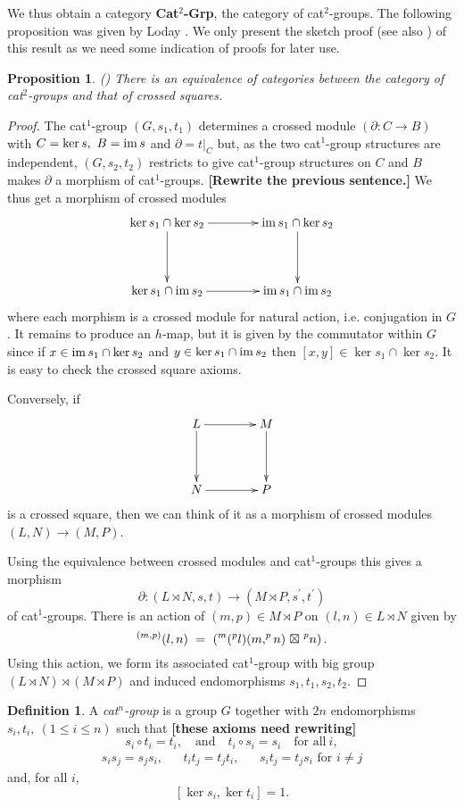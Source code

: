 \documentclass[a4paper,11pt]{article}
\theoremstyle{plain}
\newtheorem{proposition}[theorem]{Proposition}
\theoremstyle{definition}
\newtheorem{definition}[theorem]{Definition}
\begin{document}
We thus obtain a category \textbf{Cat}$^{2}$\textbf{-Grp}, 
the category of cat$^{2}$-groups. 
The following proposition was given by Loday \cite{Loday}. 
We only present the sketch proof (see also \cite{mutpor}) of this result 
as we need some indication of proofs for later use.

\begin{proposition}
	\label{loday} \emph{(\cite{Loday})} 
	There is an equivalence of categories between the category of cat$^{2}$-groups 
	and that of crossed squares.
\end{proposition}
\begin{proof}
	The cat$^{1}$-group $(G,s_1,t_1)$ determines a crossed module 
	$(\partial : C \rightarrow B)$ with $C = \ker s,~ B = \mathrm{im}\, s$ and $\partial =t|_{C}$ 
	but, as the two cat$^{1}$-group structures are independent, 
	$(G,s_2,t_2)$ restricts to give cat$^{1}$-group structures on $C$ 
	and $B$ makes $\partial $ a morphism of cat$^{1}$-groups. 
	{\bf[Rewrite the previous sentence.]} 
	We thus get a morphism of crossed modules
	\[
	\xymatrix@R=40pt@C=40pt
	{ \ker s_1 \cap \ker s_2 \ar[d] \ar[r] 
		& \im s_1 \cap \ker s_2 \ar[d] \\ 
		\ker s_1 \cap \im s_2 \ar[r] 
		& \im s_1 \cap \im s_2 } 
	\]
	\noindent where each morphism is a crossed module for natural action, 
	i.e. conjugation in $G$. 
	It remains to produce an $h$-map, but it is given by the commutator within $G$ 
	since if $x \in \mathrm{im}\, s_1 \cap \ker s_2$ 
	and $y\in \ker s_1 \cap \mathrm{im}\, s_2$ then $[x,y] \in \ker s_1 \cap \ker s_2$. 
	It is easy to check the crossed square axioms.
	
	Conversely, if
	\[
	\xymatrix@R=40pt@C=40pt
	{ L \ar[d] \ar[r] 
		& M \ar[d] \\ 
		N \ar[r] 
		& P }  
	\]
	\noindent is a crossed square, 
	then we can think of it as a morphism of crossed modules $(L,N) \rightarrow (M,P)$.
	
	Using the equivalence between crossed modules and cat$^{1}$-groups this
	gives a morphism
	\[
	\partial : (L \rtimes N,s,t) \longrightarrow (M \rtimes P, s^{\prime}, t^{\prime})
	\]
	of cat$^{1}$-groups. 
	There is an action of $(m,p) \in M \rtimes P$ on $(l,n) \in L \rtimes N$ 
	given by
	\[
	^{(m,p)}(l,n) ~=~ (^{m}(^{p}l) (m,^{p}n) {\ \boxtimes\ } ^{p}n)\,.
	\] 
	Using this action, we form its associated cat$^{1}$-group with big group 
	$(L \rtimes N) \rtimes (M \rtimes P)$ 
	and induced endomorphisms $s_1,t_1,s_2,t_2$.
\end{proof}

\begin{definition}
	A \emph{cat$^{n}$-group} is a group $G$ together with $2n$ endomorphisms 
	$s_{i},t_{i},~ (1\leq i\leq n)$ such that 
	{\bf [these axioms need rewriting]} 
	\[
	s_{i} \circ t_{i} = t_{i}, \quad\text{and}\quad 
	t_{i} \circ s_{i} = s_{i} \quad\mbox{for all}~i,  
	\]
	\[
	\begin{array}{ccccc}
	s_{i}s_{j}=s_{j}s_{i}, &  & t_{i}t_{j}=t_{j}t_{i}, &  & s_{i}t_{j}=t_{j}s_{i}%
	\text{ for }i\neq j%
	\end{array}%
	\]%
	and, for all $i$,%
	\[
	\left[ \ker s_{i},\ker t_{i}\right] =1.
	\]
\end{definition}
\end{document}
